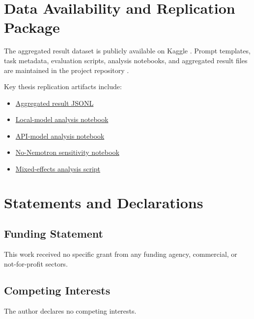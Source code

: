 \section{Data Availability and Replication Package\label{sec:replication}}

The aggregated result dataset is publicly available on Kaggle \cite{promptframingkaggle2026}. Prompt templates, task metadata, evaluation scripts, analysis notebooks, and aggregated result files are maintained in the project repository \cite{promptframingrepo2026}.

Key thesis replication artifacts include:
\begin{itemize}
\tightlist
\item
 \href{https://github.com/tycoi2005/prompt-framing-experiment/blob/main/02ScalingPhrase/results_analysis/prompt_framing_experiment_results.jsonl}{Aggregated result JSONL}
\item
 \href{https://github.com/tycoi2005/prompt-framing-experiment/blob/main/02ScalingPhrase/results_analysis/notebooks/smallmodels_analysis.executed.ipynb}{Local-model analysis notebook}
\item
 \href{https://github.com/tycoi2005/prompt-framing-experiment/blob/main/02ScalingPhrase/results_analysis/notebooks/apimodels_analysis.executed.ipynb}{API-model analysis notebook}
\item
 \href{https://github.com/tycoi2005/prompt-framing-experiment/blob/main/02ScalingPhrase/results_analysis/notebooks/smallmodels_without_nemotron_analysis.executed.ipynb}{No-Nemotron sensitivity notebook}
\item
 \href{https://github.com/tycoi2005/prompt-framing-experiment/blob/main/10Paperv3/scripts/run_mixed_effects_analysis.py}{Mixed-effects analysis script}
\end{itemize}

\section{Statements and Declarations}

\subsection{Funding Statement}
This work received no specific grant from any funding agency, commercial, or not-for-profit sectors.

\subsection{Competing Interests}
The author declares no competing interests.

